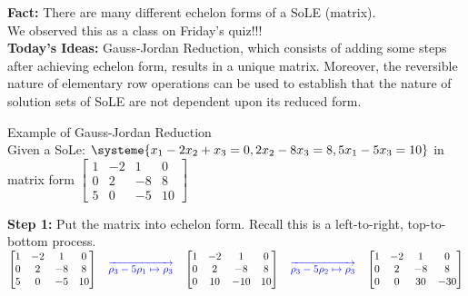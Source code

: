 \documentclass[11pt,fleqn]{article}
\begin{document}
\renewcommand{\headrulewidth}{0pt}
\newcommand{\blank}[1]{\rule{#1}{0.75pt}}
\renewcommand{\d}{\displaystyle}
\vspace*{-0.7in}
\begin{center}
  \large {}
\end{center}

\textbf{Fact:} There are many different echelon forms of a SoLE (matrix).\\

We observed this as a class on Friday's quiz!!!\\

\textbf{Today's Ideas:} Gauss-Jordan Reduction, which consists of adding some steps after achieving echelon form, results in a unique matrix. Moreover, the reversible nature of elementary row operations can be used to establish that the nature of solution sets of SoLE are not dependent upon its reduced form.

\noindent \hrulefill

\noindent Example of Gauss-Jordan Reduction\\

Given a SoLe: $\systeme{x_1-2x_2+x_3=0,2x_2-8x_3=8,5x_1-5x_3=10}$ in matrix form $\begin{bmatrix} 1&-2&1&0\\0&2&-8&8\\5&0&-5&10 \end{bmatrix}$ \\

\vfill

\noindent \textbf{Step 1:} Put the matrix into echelon form. Recall this is a left-to-right, top-to-bottom process.\\

$\begin{bmatrix} 1&-2&1&0\\0&2&-8&8\\5&0&-5&10 \end{bmatrix} \quad \textcolor{blue}{\overrightarrow{\rho_3-5\rho_1 \mapsto \rho_3}} \quad \begin{bmatrix} 1&-2&1&0\\0&2&-8&8\\0&10&-10&10 \end{bmatrix} \quad \textcolor{blue}{\overrightarrow{\rho_3-5\rho_2 \mapsto \rho_3}} \quad 
\begin{bmatrix} 1&-2&1&0\\0&2&-8&8\\0&0&30&-30 \end{bmatrix}$\\
\end{document}
